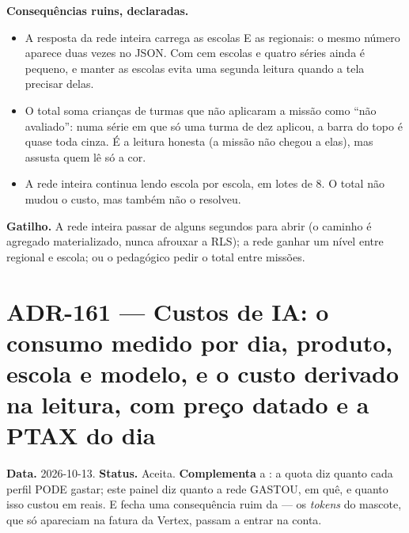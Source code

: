 \textbf{Consequências ruins, declaradas.}
\begin{itemize}
  \item A resposta da rede inteira carrega as escolas E as regionais: o mesmo
    número aparece duas vezes no JSON. Com cem escolas e quatro séries ainda é
    pequeno, e manter as escolas evita uma segunda leitura quando a tela
    precisar delas.
  \item O total soma crianças de turmas que não aplicaram a missão como
    \enquote{não avaliado}: numa série em que só uma turma de dez aplicou, a
    barra do topo é quase toda cinza. É a leitura honesta (a missão não chegou
    a elas), mas assusta quem lê só a cor.
  \item A rede inteira continua lendo escola por escola, em lotes de 8. O total
    não mudou o custo, mas também não o resolveu.
\end{itemize}

\textbf{Gatilho.} A rede inteira passar de alguns segundos para abrir (o
caminho é agregado materializado, nunca afrouxar a RLS); a rede ganhar um nível
entre regional e escola; ou o pedagógico pedir o total entre missões.
\section{ADR-161 --- Custos de IA: o consumo medido por dia, produto, escola e modelo, e o custo derivado na leitura, com preço datado e a PTAX do dia}
\label{adr:custos-de-ia}

\textbf{Data.} 2026-10-13. \textbf{Status.} Aceita. \textbf{Complementa} a
: a quota diz quanto cada perfil PODE gastar; este painel diz
quanto a rede GASTOU, em quê, e quanto isso custou em reais. E fecha uma
consequência ruim da  --- os \emph{tokens} do mascote, que só
apareciam na fatura da Vertex, passam a entrar na conta.

